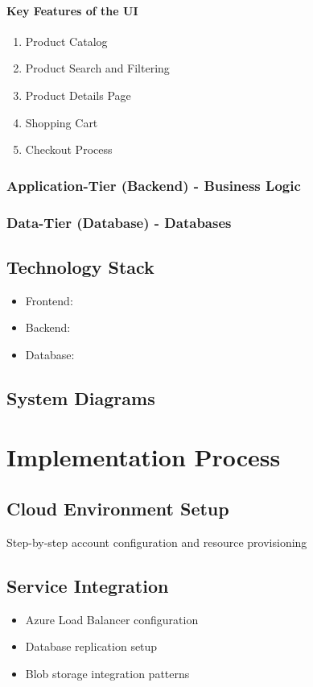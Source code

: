 \documentclass{llncs}
\begin{document}
\paragraph{Key Features of the UI}
    \begin{enumerate}
        \item Product Catalog
        \item Product Search and Filtering
        \item Product Details Page
        \item Shopping Cart
        \item Checkout Process
    \end{enumerate}
\subsubsection{Application-Tier (Backend) - Business Logic}
\subsubsection{Data-Tier (Database) - Databases}
\subsection{Technology Stack}
\begin{itemize}
    \item Frontend: 
    \item Backend: 
    \item Database: 

\end{itemize}

\subsection{System Diagrams}

\section{Implementation Process}
\subsection{Cloud Environment Setup}
Step-by-step account configuration and resource provisioning

\subsection{Service Integration}
\begin{itemize}
    \item Azure Load Balancer configuration
    \item Database replication setup
    \item Blob storage integration patterns
\end{itemize}
\end{document}
